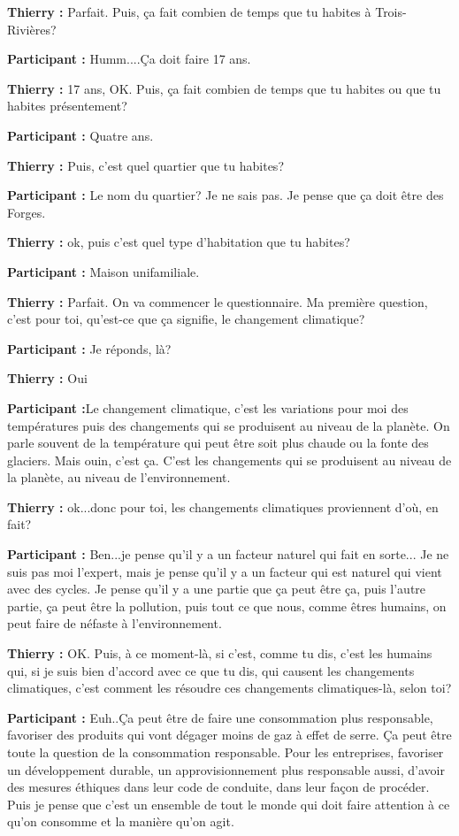 \textbf{Thierry :} Parfait. Puis, ça fait combien de temps que tu habites à Trois-Rivières?

\textbf{Participant :} Humm....Ça doit faire 17 ans.

\textbf{Thierry :} 17 ans, OK. Puis, ça fait combien de temps que tu habites ou que tu habites présentement?

\textbf{Participant :} Quatre ans.

\textbf{Thierry :} Puis, c'est quel quartier que tu habites?

\textbf{Participant :} Le nom du quartier? Je ne sais pas. Je pense que ça doit être des Forges.

\textbf{Thierry :} ok, puis c'est quel type d'habitation que tu habites?

\textbf{Participant :} Maison unifamiliale.

\textbf{Thierry :} Parfait. On va commencer le questionnaire. Ma première question, c'est pour toi, qu'est-ce que ça signifie, le changement climatique?

\textbf{Participant :} Je réponds, là? 

\textbf{Thierry :} Oui

\textbf{Participant :}Le changement climatique, c'est les variations pour moi des températures puis des changements qui se produisent au niveau de la planète. On parle souvent de la température qui peut être soit plus chaude ou la fonte des glaciers. Mais ouin, c'est ça. C'est les changements qui se produisent au niveau de la planète, au niveau de l'environnement.

\textbf{Thierry :} ok...donc pour toi, les changements climatiques proviennent d'où, en fait?

\textbf{Participant :} Ben...je pense qu'il y a un facteur naturel qui fait en sorte... Je ne suis pas moi l'expert, mais je pense qu'il y a un facteur qui est naturel qui vient avec des cycles. Je pense qu'il y a une partie que ça peut être ça, puis l'autre partie, ça peut être la pollution, puis tout ce que nous, comme êtres humains, on peut faire de néfaste à l'environnement.

\textbf{Thierry :} OK. Puis, à ce moment-là, si c'est, comme tu dis, c'est les humains qui, si je suis bien d'accord avec ce que tu dis, qui causent les changements climatiques, c'est comment les résoudre ces changements climatiques-là, selon toi?

\textbf{Participant :} Euh..Ça peut être de faire une consommation plus responsable, favoriser des produits qui vont dégager moins de gaz à effet de serre. Ça peut être toute la question de la consommation responsable. Pour les entreprises, favoriser un développement durable, un approvisionnement plus responsable aussi, d'avoir des mesures éthiques dans leur code de conduite, dans leur façon de procéder. Puis je pense que c'est un ensemble de tout le monde qui doit faire attention à ce qu'on consomme et la manière qu'on agit.

